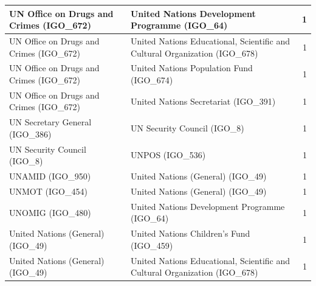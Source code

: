 \documentclass{article}
\begin{document}
\begin{table}[H]
\begin{center}
\begin{tabularx}{\textwidth}{|X|X|r|}
\hline
UN Office on Drugs and Crimes (IGO\_672) & United Nations Development Programme (IGO\_64) & 1 \\
\hline
UN Office on Drugs and Crimes (IGO\_672) & United Nations Educational, Scientific and Cultural Organization (IGO\_678) & 1 \\
\hline
UN Office on Drugs and Crimes (IGO\_672) & United Nations Population Fund (IGO\_674) & 1 \\
\hline
UN Office on Drugs and Crimes (IGO\_672) & United Nations Secretariat (IGO\_391) & 1 \\
\hline
UN Secretary General (IGO\_386) & UN Security Council (IGO\_8) & 1 \\
\hline
UN Security Council (IGO\_8) & UNPOS (IGO\_536) & 1 \\
\hline
UNAMID (IGO\_950) & United Nations (General) (IGO\_49) & 1 \\
\hline
UNMOT (IGO\_454) & United Nations (General) (IGO\_49) & 1 \\
\hline
UNOMIG (IGO\_480) & United Nations Development Programme (IGO\_64) & 1 \\
\hline
United Nations (General) (IGO\_49) & United Nations Children's Fund (IGO\_459) & 1 \\
\hline
United Nations (General) (IGO\_49) & United Nations Educational, Scientific and Cultural Organization (IGO\_678) & 1 \\
\hline
\end{tabularx}
\end{center}
\normalsize
\end{table}
\end{document}
